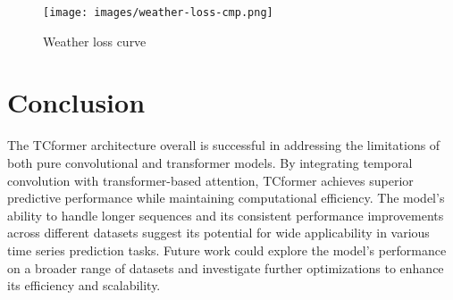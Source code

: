 \documentclass[stu,12pt,floatsintext]{apa7}
\begin{document}
\begin{figure}[H]
    \centering
    \texttt{[image: images/weather-loss-cmp.png]}
    \caption{Weather loss curve}
    \label{fig:weather-loss-curve}
\end{figure}



\section{Conclusion}
The TCformer architecture overall is successful in addressing the limitations of both pure convolutional and transformer models. By integrating temporal convolution with transformer-based attention, TCformer achieves superior predictive performance while maintaining computational efficiency. The model's ability to handle longer sequences and its consistent performance improvements across different datasets suggest its potential for wide applicability in various time series prediction tasks. Future work could explore the model's performance on a broader range of datasets and investigate further optimizations to enhance its efficiency and scalability.


\printbibliography
\end{document}
